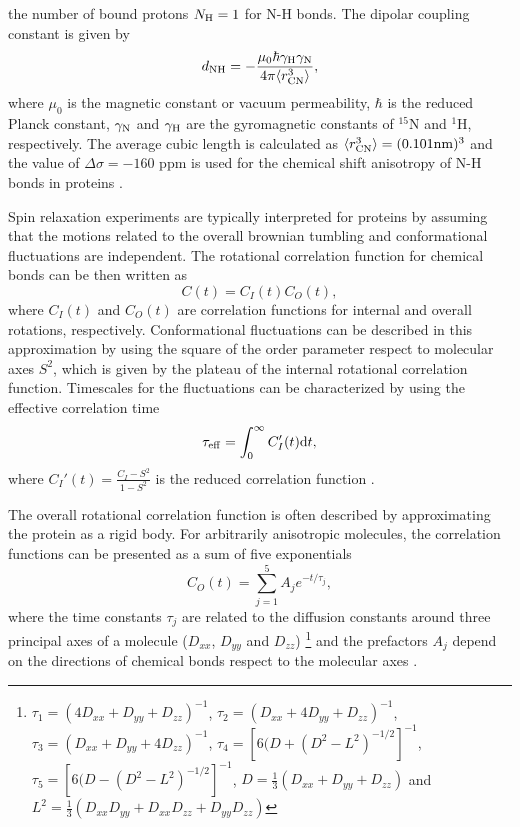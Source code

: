 \documentclass[pre,aps,floatfix,authordate1-4,twocolumn]{revtex4-1}
\begin{document}
the number of bound protons $N_{\rm{H}}=1$ for N-H bonds.
The dipolar coupling constant is given by
\begin{equation}
d_{\rm{NH}}=-\frac{\mu_0\hbar\gamma_{\rm{H}}\gamma_{\rm{N}}}{4\pi\langle r_{\rm{CN}}^3\rangle},\nonumber
\end{equation}
where $\mu_0$ is the magnetic constant or vacuum permeability, $\hbar$ is the reduced Planck constant,
$\gamma_{\rm{N}}$ and $\gamma_{\rm{H}}$ are the gyromagnetic constants of $^{15}$N and $^1$H, respectively.
The average cubic length is calculated as $\langle r_{\rm{CN}}^3\rangle = (0.101{\rm nm})^3$ and the 
value of $\Delta \sigma = -160$ ppm is used for the chemical shift anisotropy of N-H bonds in 
proteins \cite{kay89,hiyama88}.

Spin relaxation experiments are typically interpreted for proteins by
assuming that the motions related to the overall brownian tumbling 
and conformational fluctuations are independent.
The rotational correlation function for chemical bonds can be then written
as  \cite{wennerstrom79,Lipari82,jarymowycz06,korzhnev01,halle09}
\begin{equation}\label{CORRFsep}
  C(t)=C_I(t)C_O(t),
\end{equation}
where $C_I(t)$ and $C_O(t)$ are correlation functions for internal and overall
rotations, respectively. Conformational fluctuations can be described
in this approximation by using the square of the order parameter respect to 
molecular axes $S^2$, which is given by the plateau of the internal rotational 
correlation function. Timescales for the fluctuations can be characterized by
using the effective correlation time 
\begin{equation}\label{effCT}
  \tau_{\rm eff}=\int_0^\infty C_I'(t) \mathrm{d}t,
\end{equation}
where $C_I'(t)=\frac{C_I-S^2}{1-S^2}$ is the reduced correlation function \cite{Lipari82}.

The overall rotational correlation function is often described
by approximating the protein as a rigid body.
For arbitrarily anisotropic molecules, the correlation functions
can  be presented as a sum of five exponentials~\cite{woessner62,korzhnev01}
\begin{equation}\label{CORRFanisot}
  C_O(t)=\sum_{j=1}^5 A_j e^{-t/\tau_j},
\end{equation}
where the time constants $\tau_j$ are related 
to the diffusion constants around
three principal axes of a molecule
($D_{xx}$, $D_{yy}$ and $D_{zz}$)  
\footnote{
$\tau_1=(4D_{xx}+D_{yy}+D_{zz})^{-1}$,
$\tau_2=(D_{xx}+4D_{yy}+D_{zz})^{-1}$,
$\tau_3=(D_{xx}+D_{yy}+4D_{zz})^{-1}$,
$\tau_4=[6(D+(D^2-L^2)^{-1/2}]^{-1}$,
$\tau_5=[6(D-(D^2-L^2)^{-1/2}]^{-1}$,
$D=\frac{1}{3}(D_{xx}+D_{yy}+D_{zz})$ and 
$L^2=\frac{1}{3}(D_{xx}D_{yy}+D_{xx}D_{zz}+D_{yy}D_{zz})$}
and the prefactors $A_j$ depend on the directions of chemical bonds 
respect to the molecular axes \cite{woessner62,luginbuhl97}.
\end{document}
